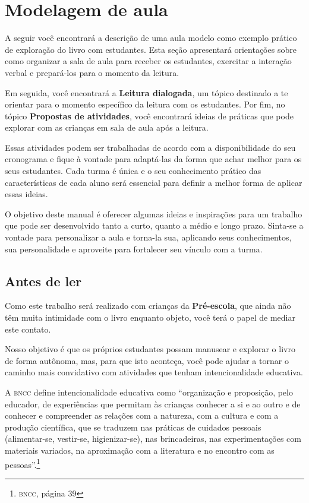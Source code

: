 \documentclass[11pt]{extarticle}
\begin{document}
\section{Modelagem de aula}
A seguir você encontrará a descrição de uma aula modelo como exemplo 
prático de exploração do livro com estudantes. Esta seção apresentará 
orientações sobre como organizar a sala de aula para receber os 
estudantes, exercitar a interação verbal e prepará-los para o 
momento da leitura.

Em seguida, você encontrará a \textbf{Leitura dialogada}, um 
tópico destinado a te orientar para o momento específico da 
leitura com os estudantes. Por fim, no tópico 
\textbf{Propostas de atividades}, você encontrará ideias 
de práticas que pode explorar com as crianças em sala de 
aula após a leitura. 

Essas atividades podem ser trabalhadas de acordo com a 
disponibilidade do seu cronograma e fique à vontade para adaptá-las 
da forma que achar melhor para os seus estudantes. Cada turma é única 
e o seu conhecimento prático das características de cada aluno será 
essencial para definir a melhor forma de aplicar essas ideias. 

O objetivo deste manual é oferecer algumas ideias 
e inspirações para um trabalho que pode ser desenvolvido tanto 
a curto, quanto a médio e longo prazo. Sinta-se a vontade para 
personalizar a aula e torna-la sua, aplicando seus conhecimentos, sua 
personalidade e aproveite para fortalecer 
seu vínculo com a turma.


\subsection{Antes de ler}


Como este trabalho será realizado com crianças da \textbf{Pré-escola}, 
que ainda não têm muita intimidade com o livro enquanto objeto, você terá o 
papel de mediar este contato. 

Nosso objetivo é que os próprios estudantes possam manusear 
e explorar o livro de forma autônoma, mas, para que isto aconteça, você 
pode ajudar a tornar o caminho mais convidativo com atividades que tenham 
intencionalidade educativa. 

A \textsc{bncc} define intencionalidade educativa como ``organização 
e proposição, pelo educador, de experiências que permitam às crianças 
conhecer a si e ao outro e de conhecer e compreender as relações com a 
natureza, com a cultura e com a produção científica, que se traduzem nas 
práticas de cuidados pessoais (alimentar-se, vestir-se, higienizar-se), 
nas brincadeiras, nas experimentações com materiais 
variados, na aproximação com a literatura e no encontro com as 
pessoas''.\footnote{\textsc{bncc}, página 39}
\end{document}
